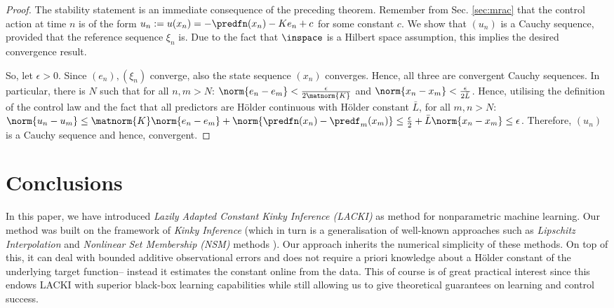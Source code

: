 \begin{proof} The stability statement is an immediate consequence of the preceding theorem. 
Remember from Sec. \ref{sec:mrac} that the control action at time $n$ is of the form $u_n := u(x_n) = -\predfn(x_n) - K e_n +c $ for some constant $c$. We show that $(u_n)$ is a Cauchy sequence, provided that the reference sequence $\xi_n$ is. Due to the fact that $\inspace$ is a Hilbert space assumption, this implies the desired convergence result.

So, let $\epsilon >0$. Since $(e_n),(\xi_n)$ converge, also the state sequence $(x_n)$ converges. Hence, all three are convergent Cauchy sequences. In particular, there is $N$ such that for all $n,m >N$: $\norm{e_n-e_m}< \frac{\epsilon} {2 \matnorm{K}}$ and $\norm{x_n-x_m}< \frac{\epsilon} {2\bar L}$. 
Hence, utilising the definition of the control law and the fact that all predictors are H\"older continuous with H\"older constant $\bar L$, for all $m,n >N:$ $\norm{u_n-u_m} \leq \matnorm{K} \norm{e_n -e_m} + \norm{\predfn(x_n) - \predf_m(x_m) } \leq \frac{\epsilon}{2} + \bar L \norm{x_n -x_m} \leq \epsilon $. Therefore, $(u_n)$ is a Cauchy sequence and hence, convergent.

\end{proof}



%

\section{Conclusions}
\label{sec:concl}
In this paper, we have introduced \emph{Lazily Adapted Constant Kinky Inference (LACKI)} as method for nonparametric machine learning. Our method was built on the framework of \emph{Kinky Inference} (which in turn is a generalisation of well-known approaches such as \emph{Lipschitz Interpolation} \cite{Sukharev1978,Zabinsky2003,Beliakov2006} and \emph{Nonlinear Set Membership (NSM)}  methods \cite{Milanese2004}). 
 Our approach inherits the numerical simplicity of these methods. On top of this, it can deal with bounded additive observational errors and does not require a priori knowledge about a H\"older constant of the underlying target function--  instead it estimates the constant online from the data. This of course is of great practical interest since this endows LACKI with superior black-box learning capabilities while still allowing us to give theoretical guarantees on learning and control success.
 
